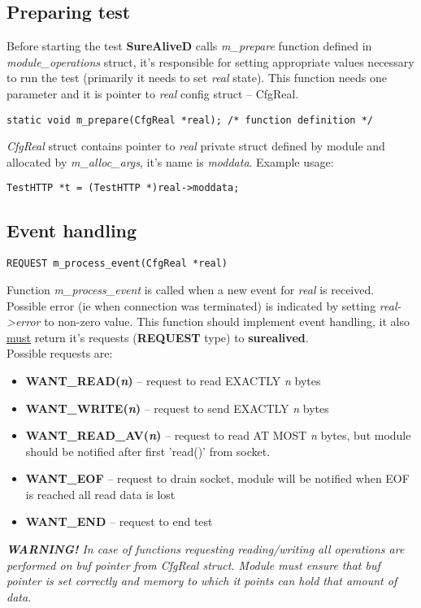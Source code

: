 \documentclass[polish,12pt]{article}
\begin{document}
\subsection{Preparing test}
Before starting the test \textbf{SureAliveD} calls \textit{m\_prepare} function defined
in \textit{module\_operations} struct, it's responsible for setting appropriate values
necessary to run the test (primarily it needs to set \textit{real} state). This
function needs one parameter and it is pointer to \textit{real} config struct -- CfgReal.

\begin{verbatim}
static void m_prepare(CfgReal *real); /* function definition */
\end{verbatim}

\textit{CfgReal} struct contains pointer to \textit{real} private struct defined by module
and allocated by \textit{m\_alloc\_args}, it's name is \textit{moddata}.
Example usage:
\begin{verbatim}
TestHTTP *t = (TestHTTP *)real->moddata;
\end{verbatim}

\newpage

\subsection{Event handling}
\begin{verbatim}
REQUEST m_process_event(CfgReal *real)
\end{verbatim}

Function \textit{m\_process\_event} is called when a new event for \textit{real} is received.
\newline
\newline
Possible error (ie when connection was terminated) is indicated by setting \textit{real->error}
to non-zero value. This function should implement event handling, it also \underline{must} return
it's requests (\textbf{REQUEST} type) to \textbf{surealived}.\\
Possible requests are:
\begin{itemize}
  \item \textbf{WANT\_READ(\textit{n})} -- request to read EXACTLY \textit{n} bytes
  \item \textbf{WANT\_WRITE(\textit{n})} -- request to send EXACTLY \textit{n} bytes
  \item \textbf{WANT\_READ\_AV(\textit{n})} -- request to read AT MOST \textit{n} bytes, but
    module should be notified after first 'read()' from socket.
  \item \textbf{WANT\_EOF} -- request to drain socket, module will be notified when EOF is reached
    \newline all read data is lost
  \item \textbf{WANT\_END} -- request to end test
\end{itemize}
\textit{\textbf{WARNING!} In case of functions requesting reading/writing all operations are
  performed on \textit{buf} pointer from CfgReal struct. Module must ensure that \textit{buf}
  pointer is set correctly and memory to which it points can hold that amount of data.}
\end{document}
